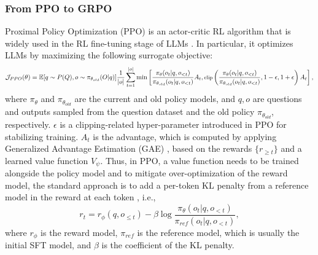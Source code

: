 \subsubsection{From PPO to GRPO} Proximal Policy Optimization (PPO) \citep{schulman2017proximal} is an actor-critic RL algorithm that is widely used in the RL fine-tuning stage of LLMs \citep{ouyang2022training}. In particular, it optimizes LLMs by maximizing the following surrogate objective:
\begin{equation}
\footnotesize
    \mathcal{J}_{PPO}(\theta) = \mathbb{E}{[q \sim P(Q), o \sim \pi_{\theta_{old}}(O|q)]} \frac{1}{|o|} \sum_{t=1}^{|o|} \min \left[ \frac{\pi_\theta(o_{t} | q, o_{<t})}{\pi_{\theta_{old}}(o_{t} | q, o_{<t})} A_{t}, \text{clip} \left( \frac{\pi_\theta(o_{t} | q, o_{<t})}{\pi_{\theta_{old}}(o_{t} | q, o_{<t})}, 1 - \epsilon, 1 + \epsilon \right)  A_{t} \right] ,
\end{equation}
where $\pi_{\theta}$ and $\pi_{\theta_{old}}$ are the current and old policy models, and $q, o$  are questions and outputs sampled from the question dataset and the old policy  $\pi_{\theta_{old}}$, respectively.  $\epsilon$ is a clipping-related hyper-parameter introduced in PPO for stabilizing training.  $A_t$  is the advantage, which is computed by applying Generalized Advantage Estimation (GAE) \citep{gae}, based on the rewards  $\{r_{\ge t}\}$  and a learned value function  $V_{\psi}$. Thus, in PPO, a value function needs to be trained alongside the policy model and to mitigate over-optimization of the reward model, the standard approach is to add a per-token KL penalty from a reference model in the reward at each token \citep{ouyang2022training}, i.e., 
\begin{equation}
    r_{t} = r_\phi(q, o_{\le t}) - \beta \log\frac{\pi_{\theta}(o_{t}|q, o_{<t})}{\pi_{ref}(o_{t}|q, o_{<t})},
\label{eq:PPO-reward}
\end{equation}
where $r_\phi$  is the reward model, $\pi_{ref}$ is the reference model, which is usually the initial SFT model, and $\beta$  is the coefficient of the KL penalty.




